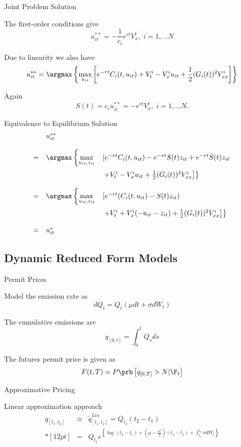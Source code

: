 {Joint Problem Solution}


	The first-order conditions give
$$
u_{it}^{**}= -\frac{1}{c_i} e^{rt} V^i_x, \; i=1, \ldots N
$$

	Due to linearity we also have
$$
u_{it}^{**}= \argmax \left\{ \max_{u_{it}} \left[e^{-rt} C_i(t,u_{it}) + V^i_t -V_x^iu_{it} + \frac{1}{2}(G_i(t))^2 V^i_{xx}\right]
\right\}
$$

	Again
$$
S(t) = c_i u_{it}^{**}= -e^{rt}V^i_x, \; i=1, \ldots N.
$$


{Equivalence to Equilibrium Solution}
$$
\begin{array}{lll}
&u_{it}^{**}&\\*[12pt]
=&  \argmax \left\{ \displaystyle \max_{u_{it},z_{it}} \right. &\left[e^{-rt} C_i(t,u_{it}) -e^{-rt}S(t)z_{it} +e^{-rt}S(t)z_{it} \right.\\*[12pt]
 &&\left.\left. + V^i_t -V_x^iu_{it} + \frac{1}{2}(G_i(t))^2 V^i_{xx}\right]
\right\}\\*[12pt]
=&  \argmax \left\{ \displaystyle \max_{u_{it},z_{it}} \right. &\left[e^{-rt} (C_i(t,u_{it}) -S(t)z_{it}) \right. \\*[12pt]
&&\left.\left. + V^i_t +V_x^i(-u_{it}-z_{it}) + \frac{1}{2}(G_i(t))^2 V^i_{xx}\right]
\right\}\\*[12pt]
=&u_{it}^*&
\end{array}
$$

\subsection{Dynamic Reduced Form Models}

{Permit Prices}


	Model  the emission rate as
$$
dQ_t = Q_t(\mu dt + \sigma dW_t)
$$

The cumulative emissions are
$$
q_{[0,t]} = \int_0^t Q_s ds
$$

The futures permit price is given as
$$
F(t,T) = P \prb\left[q_{[0,T]}>N |\F_t\right]
$$


{Approximative Pricing}


	Linear approximation approach
$$
\begin{array}{lll}
q_{[t_1,t_2]} &\approx& \tilde{q}^{Lin}_{[t_1,t_2]} = Q_{t_2} (t_2 - t_1) \\*[12pt]
&=&\displaystyle   Q_{t_1} e^{\left\{\log (t_2 - t_1) + \left(\mu-\frac{\sigma^2}{2}\right)(t_2-t_1)+\int_{t_1}^{t_2}\sigma dW_t\right\}}
\end{array}
$$

